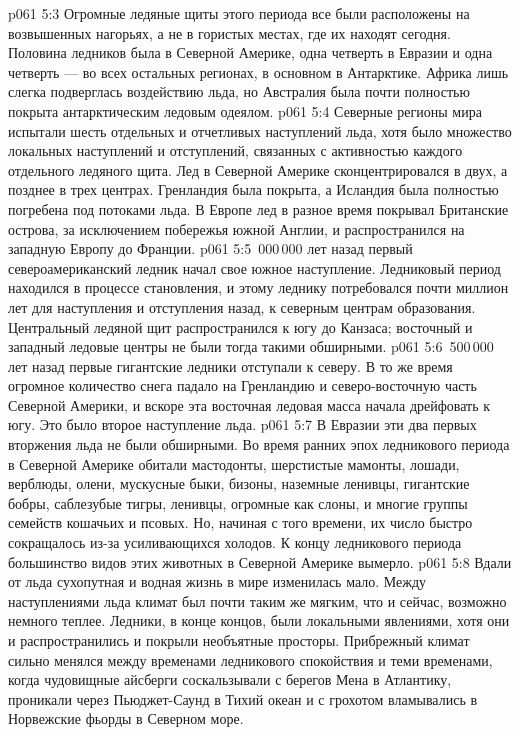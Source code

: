 \vs p061 5:3 Огромные ледяные щиты этого периода все были расположены на возвышенных нагорьях, а не в гористых местах, где их находят сегодня. Половина ледников была в Северной Америке, одна четверть в Евразии и одна четверть --- во всех остальных регионах, в основном в Антарктике. Африка лишь слегка подверглась воздействию льда, но Австралия была почти полностью покрыта антарктическим ледовым одеялом.
\vs p061 5:4 Северные регионы мира испытали шесть отдельных и отчетливых наступлений льда, хотя было множество локальных наступлений и отступлений, связанных с активностью каждого отдельного ледяного щита. Лед в Северной Америке сконцентрировался в двух, а позднее в трех центрах. Гренландия была покрыта, а Исландия была полностью погребена под потоками льда. В Европе лед в разное время покрывал Британские острова, за исключением побережья южной Англии, и распространился на западную Европу до Франции.
\vs p061 5:5 \,000\,000 лет назад первый североамериканский ледник начал свое южное наступление. Ледниковый период находился в процессе становления, и этому леднику потребовался почти миллион лет для наступления и отступления назад, к северным центрам образования. Центральный ледяной щит распространился к югу до Канзаса; восточный и западный ледовые центры не были тогда такими обширными.
\vs p061 5:6 \,500\,000 лет назад первые гигантские ледники отступали к северу. В то же время огромное количество снега падало на Гренландию и северо\hyp{}восточную часть Северной Америки, и вскоре эта восточная ледовая масса начала дрейфовать к югу. Это было второе наступление льда.
\vs p061 5:7 В Евразии эти два первых вторжения льда не были обширными. Во время ранних эпох ледникового периода в Северной Америке обитали мастодонты, шерстистые мамонты, лошади, верблюды, олени, мускусные быки, бизоны, наземные ленивцы, гигантские бобры, саблезубые тигры, ленивцы, огромные как слоны, и многие группы семейств кошачьих и псовых. Но, начиная с того времени, их число быстро сокращалось из\hyp{}за усиливающихся холодов. К концу ледникового периода большинство видов этих животных в Северной Америке вымерло.
\vs p061 5:8 Вдали от льда сухопутная и водная жизнь в мире изменилась мало. Между наступлениями льда климат был почти таким же мягким, что и сейчас, возможно немного теплее. Ледники, в конце концов, были локальными явлениями, хотя они и распространились и покрыли необъятные просторы. Прибрежный климат сильно менялся между временами ледникового спокойствия и теми временами, когда чудовищные айсберги соскальзывали с берегов Мена в Атлантику, проникали через Пьюджет\hyp{}Саунд в Тихий океан и с грохотом вламывались в Норвежские фьорды в Северном море.
